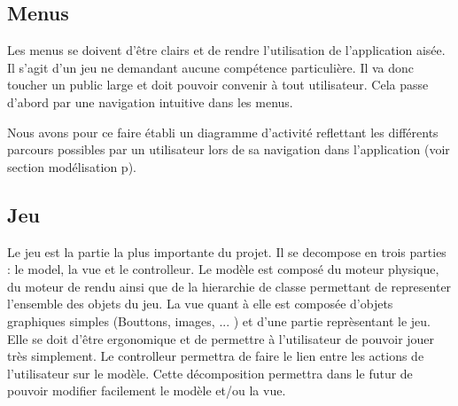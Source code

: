 \subsection{Menus}
		
	Les menus se doivent d'être clairs et de rendre l'utilisation de
	l'application aisée. Il s'agit d'un jeu ne demandant aucune compétence
	particulière. Il va donc toucher un public large et doit pouvoir convenir à
	tout utilisateur. Cela passe d'abord par une navigation intuitive dans les
	menus.
	
	Nous avons pour ce faire établi un diagramme d'activité reflettant les
	différents parcours possibles par un utilisateur lors de sa navigation dans
	l'application (voir section modélisation p\pageref{activité}).
		
\subsection{Jeu}
		
	Le jeu est la partie la plus importante du projet. 
	Il se decompose en trois parties : le model, la vue et le controlleur. 
	Le modèle est composé du moteur physique, du moteur de rendu ainsi que de la
	hierarchie de classe permettant de representer l'ensemble des objets du jeu. 
	La vue quant à elle est composée d'objets graphiques simples (Bouttons, images, ... ) 
	et d'une partie reprèsentant le jeu. Elle se doit d'être ergonomique et de permettre
	à l'utilisateur de pouvoir jouer très simplement. Le controlleur permettra de faire 
	le lien entre les actions de l'utilisateur sur le modèle. Cette décomposition permettra dans 
	le futur de pouvoir modifier facilement le modèle et/ou la vue.
		
